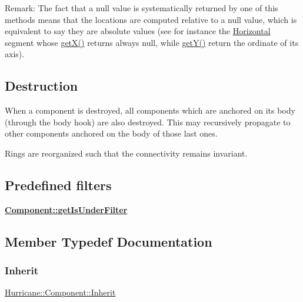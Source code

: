 \begin{DoxyParagraph}{Remark\+:}
The fact that a null value is systematically returned by one of this methods means that the locations are computed relative to a null value, which is equivalent to say they are absolute values (see for instance the \hyperlink{classHurricane_1_1Horizontal}{Horizontal} segment whose \hyperlink{classHurricane_1_1Component_a0f8299ed73705fd4fbf56589dcc7e074}{get\+X()} returns always null, while \hyperlink{classHurricane_1_1Component_a727da3f127c3a7a0a09468219f98c3e6}{get\+Y()} return the ordinate of its axis).
\end{DoxyParagraph}
\hypertarget{classHurricane_1_1Component_secComponentDestruction}{}\subsection{Destruction}\label{classHurricane_1_1Component_secComponentDestruction}
When a component is destroyed, all components which are anchored on its body (through the body hook) are also destroyed. This may recursively propagate to other components anchored on the body of those last ones.

Rings are reorganized such that the connectivity remains invariant.\hypertarget{classHurricane_1_1Component_secComponentPredefinedFilters}{}\subsection{Predefined filters}\label{classHurricane_1_1Component_secComponentPredefinedFilters}
{\bfseries \hyperlink{classHurricane_1_1Component_a8680f2756892366db8642bfcfd7ce097}{Component\+::get\+Is\+Under\+Filter}} 

\subsection{Member Typedef Documentation}
\mbox{\label{classHurricane_1_1Component_a3911e94f9d220eb809d349b1181034e3}} 
\subsubsection{\texorpdfstring{Inherit}{Inherit}}
{\footnotesize\ttfamily \hyperlink{classHurricane_1_1Component_a3911e94f9d220eb809d349b1181034e3}{Hurricane\+::\+Component\+::\+Inherit}}

